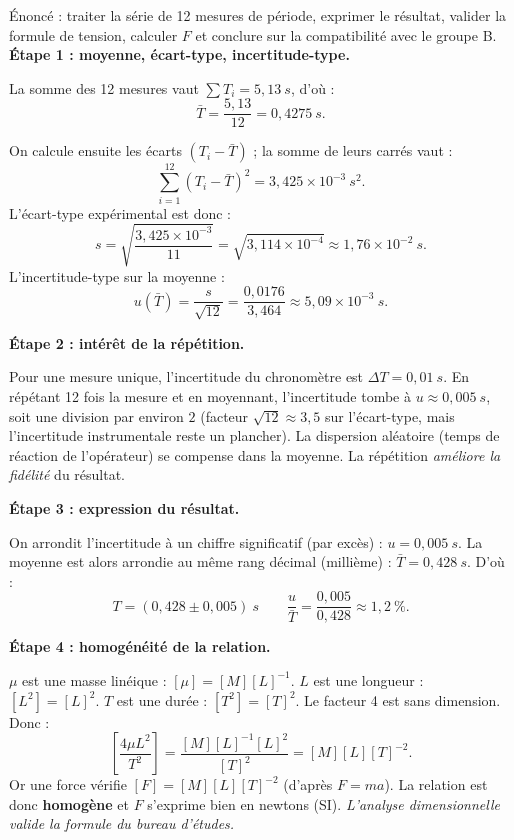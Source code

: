 \documentclass[11pt]{article}
\begin{document}
\begin{exoresolu}
Énoncé : traiter la série de 12 mesures de période, exprimer le résultat, valider la formule de tension, calculer $F$ et conclure sur la compatibilité avec le groupe B.
\tcblower
\textbf{Étape 1 : moyenne, écart-type, incertitude-type.}

La somme des 12 mesures vaut $\sum T_i = 5{,}13\ \si{s}$, d'où :
\[ \bar{T} = \dfrac{5{,}13}{12} = 0{,}4275\ \si{s}. \]

On calcule ensuite les écarts $(T_i - \bar{T})$ ; la somme de leurs carrés vaut :
\[ \sum_{i=1}^{12}(T_i - \bar{T})^{2} = 3{,}425\times 10^{-3}\ \si{s^{2}}. \]
L'écart-type expérimental est donc :
\[ s = \sqrt{\dfrac{3{,}425\times 10^{-3}}{11}} = \sqrt{3{,}114\times 10^{-4}} \approx 1{,}76\times 10^{-2}\ \si{s}. \]
L'incertitude-type sur la moyenne :
\[ u(\bar{T}) = \dfrac{s}{\sqrt{12}} = \dfrac{0{,}0176}{3{,}464} \approx 5{,}09\times 10^{-3}\ \si{s}. \]

\textbf{Étape 2 : intérêt de la répétition.}

Pour une mesure unique, l'incertitude du chronomètre est $\Delta T = 0{,}01\ \si{s}$. En répétant 12 fois la mesure et en moyennant, l'incertitude tombe à $u \approx 0{,}005\ \si{s}$, soit une division par environ $2$ (facteur $\sqrt{12} \approx 3,5$ sur l'écart-type, mais l'incertitude instrumentale reste un plancher). La dispersion aléatoire (temps de réaction de l'opérateur) se compense dans la moyenne. La répétition \emph{améliore la fidélité} du résultat.

\textbf{Étape 3 : expression du résultat.}

On arrondit l'incertitude à un chiffre significatif (par excès) : $u = 0{,}005\ \si{s}$. La moyenne est alors arrondie au même rang décimal (millième) : $\bar{T} = 0{,}428\ \si{s}$. D'où :
\[ \boxed{T = (0{,}428 \pm 0{,}005)\ \si{s}} \qquad \dfrac{u}{\bar{T}} = \dfrac{0{,}005}{0{,}428} \approx 1{,}2\ \%. \]

\textbf{Étape 4 : homogénéité de la relation.}

$\mu$ est une masse linéique : $[\mu] = [M][L]^{-1}$. $L$ est une longueur : $[L^{2}] = [L]^{2}$. $T$ est une durée : $[T^{2}] = [T]^{2}$. Le facteur 4 est sans dimension. Donc :
\[ \left[\dfrac{4\mu L^{2}}{T^{2}}\right] = \dfrac{[M][L]^{-1}[L]^{2}}{[T]^{2}} = [M][L][T]^{-2}. \]
Or une force vérifie $[F] = [M][L][T]^{-2}$ (d'après $F = ma$). La relation est donc \textbf{homogène} et $F$ s'exprime bien en newtons (SI). \emph{L'analyse dimensionnelle valide la formule du bureau d'études.}


\end{exoresolu}
\end{document}
